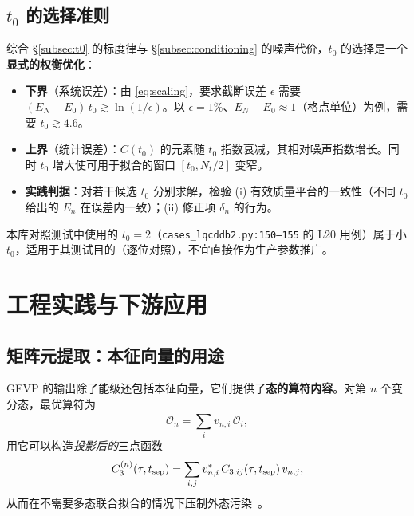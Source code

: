 \documentclass[12pt,a4paper]{ctexart}
\theoremstyle{definition}
\newcommand{\code}[1]{\texttt{#1}}
\begin{document}
\subsection{$t_0$ 的选择准则}\label{subsec:t0choice}

综合 §\ref{subsec:t0} 的标度律与 §\ref{subsec:conditioning} 的噪声代价，$t_0$ 的选择是一个\textbf{显式的权衡优化}：

\begin{itemize}[nosep]
    \item \textbf{下界}（系统误差）：由 \eqref{eq:scaling}，要求截断误差 $\epsilon$ 需要 $(E_N-E_0)\,t_0 \gtrsim \ln(1/\epsilon)$。以 $\epsilon=1\%$、$E_N-E_0\approx1$（格点单位）为例，需要 $t_0\gtrsim4.6$。
    \item \textbf{上界}（统计误差）：$C(t_0)$ 的元素随 $t_0$ 指数衰减，其相对噪声指数增长。同时 $t_0$ 增大使可用于拟合的窗口 $[t_0, N_t/2]$ 变窄。
    \item \textbf{实践判据}：对若干候选 $t_0$ 分别求解，检验 (i) 有效质量平台的一致性（不同 $t_0$ 给出的 $E_n$ 在误差内一致）；(ii) 修正项 $\delta_n$ 的行为。
\end{itemize}

本库对照测试中使用的 $t_0=2$（\code{cases\_lqcddb2.py:150--155} 的 L20 用例）属于小 $t_0$，适用于其测试目的（逐位对照），不宜直接作为生产参数推广。

\section{工程实践与下游应用}\label{sec:practice}

\subsection{矩阵元提取：本征向量的用途}\label{sec:downstream}

GEVP 的输出除了能级还包括本征向量，它们提供了\textbf{态的算符内容}。对第 $n$ 个变分态，最优算符为
\begin{equation}
\widehat{\mathcal{O}}_n = \sum_i v_{n,i}\, \mathcal{O}_i ,
\end{equation}
用它可以构造\emph{投影后的}三点函数
\begin{equation}
C_3^{(n)}(\tau, t_{\rm sep}) = \sum_{i,j} v_{n,i}^*\, C_{3,ij}(\tau,t_{\rm sep})\, v_{n,j},
\end{equation}
从而在不需要多态联合拟合的情况下压制外态污染~\cite{threepoint2026}。
\end{document}
